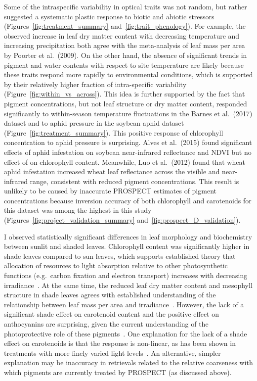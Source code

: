 Some of the intraspecific variability in optical traits was not random, but rather suggested a systematic plastic response to biotic and abiotic stressors (Figures~\ref{fig:treatment_summary} and~\ref{fig:trait_phenology}).
For example, the observed increase in leaf dry matter content with decreasing temperature and increasing precipitation both agree with the meta-analysis of leaf mass per area by Poorter et al.~(2009). \nocite{poorter_2009_causes}
On the other hand, the absence of significant trends in pigment and water contents with respect to site temperature are likely because these traits respond more rapidly to environmental conditions, which is supported by their relatively higher fraction of intra-specific variability (Figure~\ref{fig:within_vs_across}).
This idea is further supported by the fact that pigment concentrations, but not leaf structure or dry matter content, responded significantly to within-season temperature fluctuations in the Barnes et al.~(2017) \nocite{barnes_2017_beyond} dataset and to aphid pressure in the soybean aphid dataset (Figure~\ref{fig:treatment_summary}).
This positive response of chlorophyll concentration to aphid pressure is surprising.
Alves et al.~(2015) \nocite{alves_2015_soybean} found significant effects of aphid infestation on soybean near-infrared reflectance and NDVI but no effect of on chlorophyll content.
Meanwhile, Luo et al.~(2012) \nocite{luo_2012_evaluation} found that wheat aphid infestation increased wheat leaf reflectance across the visible and near-infrared range, consistent with reduced pigment concentrations.
This result is unlikely to be caused by inaccurate PROSPECT estimates of pigment concentrations because inversion accuracy of both chlorophyll and carotenoids for this dataset was among the highest in this study (Figures~\ref{fig:project_validation_summary} and~\ref{fig:prospect_D_validation}).

I observed statistically significant differences in leaf morphology and biochemistry between sunlit and shaded leaves.
Chlorophyll content was significantly higher in shade leaves compared to sun leaves, which supports established theory that allocation of resources to light absorption relative to other photosynthetic functions (e.g.\ carbon fixation and electron transport) increases with decreasing irradiance~\cite{hikosaka_1995_model}.
At the same time, the reduced leaf dry matter content and mesophyll structure in shade leaves agrees with established understanding of the relationship between leaf mass per area and irradiance~\cite{poorter_2009_causes}.
However, the lack of a significant shade effect on carotenoid content and the positive effect on anthocyanins are surprising, given the current understanding of the photoprotective role of these pigments~\cite{young_1991_photoprotective,steyn_2002_anthocyanins}.
One explanation for the lack of a shade effect on carotenoids is that the response is non-linear, as has been shown in treatments with more finely varied light levels~\cite{sonobe_2017_estimating}.
An alternative, simpler explanation may be inaccuracy in retrievals related to the relative coarseness with which pigments are currently treated by PROSPECT (as discussed above).

